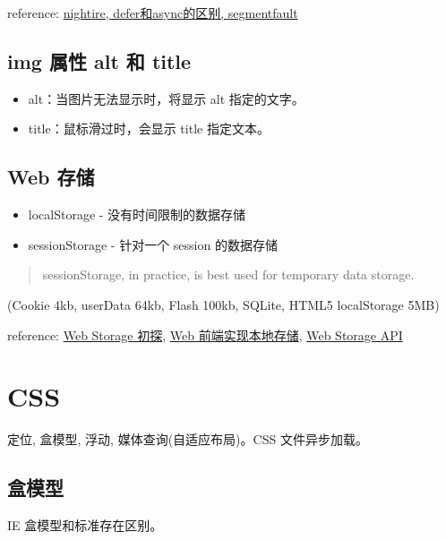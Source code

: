 reference:
\href{http://segmentfault.com/q/1010000000640869/a-1020000000641029}{nightire,
defer和async的区别, segmentfault}

\subsection{img 属性 alt 和
title}\label{img-ux5c5eux6027-alt-ux548c-title}

\begin{itemize}
\tightlist
\item
  alt：当图片无法显示时，将显示 alt 指定的文字。
\item
  title：鼠标滑过时，会显示 title 指定文本。
\end{itemize}

\subsection{Web 存储}\label{web-ux5b58ux50a8}

\begin{itemize}
\tightlist
\item
  localStorage - 没有时间限制的数据存储
\item
  sessionStorage - 针对一个 session 的数据存储
\end{itemize}

\begin{quote}
sessionStorage, in practice, is best used for temporary data storage.
\end{quote}

(Cookie 4kb, userData 64kb, Flash 100kb, SQLite, HTML5 localStorage 5MB)

reference: \href{http://segmentfault.com/a/1190000003936684}{Web Storage
初探}, \href{http://segmentfault.com/a/1190000002701423}{Web
前端实现本地存储},
\href{https://html.spec.whatwg.org/multipage/webstorage.html}{Web
Storage API}

\section{CSS}\label{css}

定位, 盒模型, 浮动, 媒体查询(自适应布局)。CSS 文件异步加载。

\subsection{盒模型}\label{ux76d2ux6a21ux578b}

IE 盒模型和标准存在区别。

